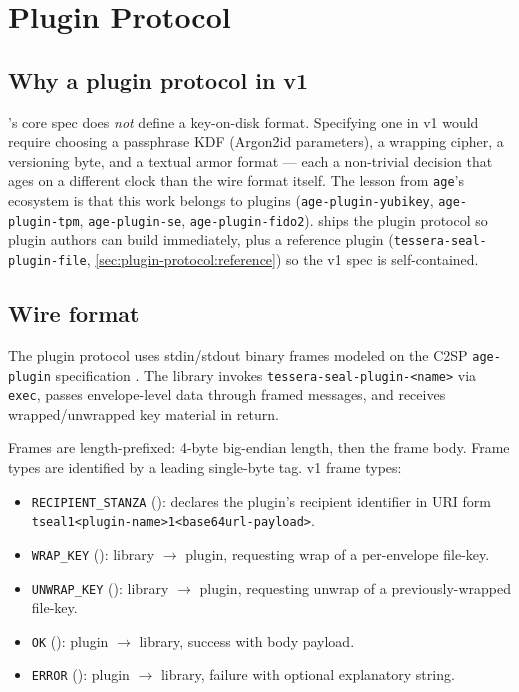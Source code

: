 \section{Plugin Protocol}
\label{sec:plugin-protocol}

\subsection{Why a plugin protocol in v1}

\pqcrypt{}'s core spec does \emph{not} define a key-on-disk format. Specifying one in v1 would require choosing a passphrase KDF (Argon2id parameters), a wrapping cipher, a versioning byte, and a textual armor format --- each a non-trivial decision that ages on a different clock than the wire format itself. The lesson from \texttt{age}'s ecosystem is that this work belongs to plugins (\texttt{age-plugin-yubikey}, \texttt{age-plugin-tpm}, \texttt{age-plugin-se}, \texttt{age-plugin-fido2}). \pqcrypt{} ships the plugin protocol so plugin authors can build immediately, plus a reference plugin (\texttt{tessera-seal-plugin-file}, \cref{sec:plugin-protocol:reference}) so the v1 spec is self-contained.

\subsection{Wire format}

The plugin protocol uses stdin/stdout binary frames modeled on the C2SP \texttt{age-plugin} specification \citep{c2sp-age-plugin}. The \pqcrypt{} library invokes \texttt{tessera-seal-plugin-\textless{}name\textgreater} via \texttt{exec}, passes envelope-level data through framed messages, and receives wrapped/unwrapped key material in return.

Frames are length-prefixed: 4-byte big-endian length, then the frame body. Frame types are identified by a leading single-byte tag. v1 frame types:

\begin{itemize}
\item \texttt{RECIPIENT\_STANZA} (): declares the plugin's recipient identifier in URI form \texttt{tseal1\textless{}plugin-name\textgreater{}1\textless{}base64url-payload\textgreater}.
\item \texttt{WRAP\_KEY} (): library $\to$ plugin, requesting wrap of a per-envelope file-key.
\item \texttt{UNWRAP\_KEY} (): library $\to$ plugin, requesting unwrap of a previously-wrapped file-key.
\item \texttt{OK} (): plugin $\to$ library, success with body payload.
\item \texttt{ERROR} (): plugin $\to$ library, failure with optional explanatory string.
\end{itemize}

